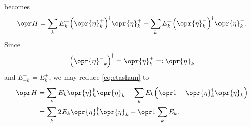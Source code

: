\documentclass[../thesis.tex]{subfiles}
\begin{document}
 becomes
\begin{equation}
  \ham
  = \sum_k E_k^+{\qty(\opr{\eta}_k^+)}^\dag\opr{\eta}_k^+
  + \sum_k E_k^-{\qty(\opr{\eta}_k^-)}^\dag\opr{\eta}_k^-.
  \label{eq:etasham}
\end{equation}
Since
\begin{equation}
  {\qty(\opr{\eta}_{-k}^-)}^\dag
  = \opr{\eta}_k^+
  \eqqcolon \opr{\eta}_k
\end{equation}
and $E_{-k}^\pm = E_k^\pm$, we may reduce \cref{eq:etasham} to
\begin{align}
  \ham
  &= \sum_k E_k\opr{\eta}_k^\dag \opr{\eta}_k
  - \sum_k E_k\qty(\idopr - \opr{\eta}_k^\dag \opr{\eta}_k)
  \\
  &= \sum_k 2E_k\opr{\eta}_k^\dag\opr{\eta}_k
  - \idopr\sum_k E_k.
  \label{eq:etaham}
\end{align}
\end{document}
